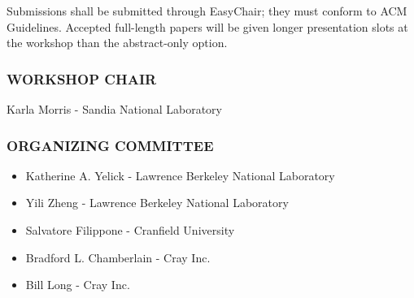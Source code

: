 \documentclass[12pt]{article}
\begin{document}
Submissions shall be submitted through EasyChair; they must conform to ACM
Guidelines. Accepted full-length papers will be given longer presentation 
slots at the workshop than the abstract-only option. 






\subsubsection*{WORKSHOP CHAIR}
Karla Morris - Sandia National Laboratory 

\subsubsection*{ORGANIZING COMMITTEE}
\begin{itemize}
\item Katherine A. Yelick - Lawrence Berkeley National Laboratory 
\item Yili Zheng - Lawrence Berkeley National Laboratory 
\item Salvatore Filippone - Cranfield University 
\item Bradford L. Chamberlain - Cray Inc.
\item Bill Long - Cray Inc. 
\end{itemize}
\end{document}
